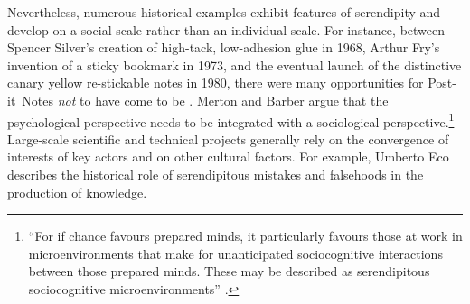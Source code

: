 Nevertheless, numerous historical examples exhibit features of
serendipity and develop on a social scale rather than an individual
scale.  For instance, between Spencer Silver's creation of high-tack,
low-adhesion glue in 1968, Arthur Fry's invention of a sticky bookmark in 1973,
and the eventual launch of the distinctive canary yellow re-stickable
notes in 1980, there were many opportunities for
Post-it\texttrademark\ Notes \emph{not} to have come to be
\cite{tce-postits}.  Merton and Barber argue that the
psychological perspective needs to be integrated with a
sociological perspective.\footnote{ ``For if chance favours prepared
  minds, it particularly favours those at work in microenvironments
  that make for unanticipated sociocognitive interactions between
  those prepared minds. These may be described as serendipitous
  sociocognitive microenvironments'' \cite[p. 259--260]{merton}.}
Large-scale scientific and technical projects generally rely on the
convergence of interests of key actors and on other cultural factors.
For example, Umberto Eco \citeyear{eco2013serendipities} describes the
historical role of serendipitous mistakes and falsehoods in the
production of knowledge.

